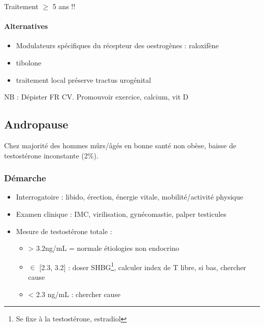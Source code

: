 \documentclass{book}
\begin{document}
Traitement \(\ge\) 5 ans !!

\paragraph{Alternatives}
\label{sec:orgc6c6287}
\begin{itemize}
\item Modulateurs spécifiques du récepteur des oestrogènes : raloxifène
\item tibolone
\item traitement local préserve tractus urogénital
\end{itemize}

NB : Dépister FR CV. Promouvoir exercice, calcium, vit D

\subsection{Andropause}
\label{sec:orged32cad}
Chez majorité des hommes mûrs/âgés en bonne santé non obèse, baisse de
testostérone inconstante (2\%).

\subsubsection{Démarche}
\label{sec:orgf730f40}
\begin{itemize}
\item Interrogatoire : libido, érection, énergie vitale, mobilité/activité physique
\item Examen clinique : IMC, virilisation, gynécomastie, palper testicules
\item Mesure de testostérone totale :
\begin{itemize}
\item > 3.2ng/mL = normale \thus étiologies non endocrino
\item \(\in\) [2.3, 3.2] : doser SHBG\footnote{Se fixe à la testostérone, estradiol}, calculer index de T libre, si bas, chercher cause
\item < 2.3 ng/mL : chercher cause
\end{itemize}
\end{itemize}
\end{document}
